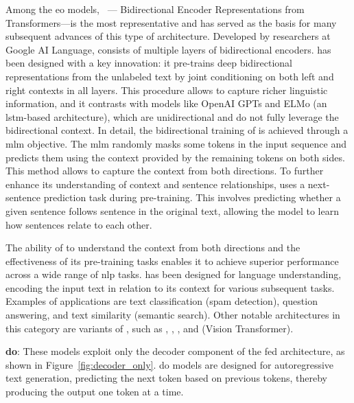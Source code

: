 Among the \gls{eo} models, ~\cite{devlin2018bert}--- Bidirectional Encoder Representations from Transformers---is the most representative and has served as the basis for many subsequent advances of this type of architecture. 
Developed by researchers at Google AI Language,  consists of multiple layers of bidirectional  encoders.
 has been designed with a key innovation: it pre-trains deep bidirectional representations from the unlabeled text by joint conditioning on both left and right contexts in all layers. 
%
This procedure allows  to capture richer linguistic information, and it contrasts with models like OpenAI GPTs and ELMo (an \gls{lstm}-based architecture), which are unidirectional and do not fully leverage the bidirectional context. 
In detail, the bidirectional training of  is achieved through a \gls{mlm} objective. The \gls{mlm} randomly masks some tokens in the input sequence and predicts them using the context provided by the remaining tokens on both sides. This method allows  to capture the context from both directions.
To further enhance its understanding of context and sentence relationships,  uses a next-sentence prediction task during pre-training. This involves predicting whether a given sentence  follows sentence  in the original text, allowing the model to learn how sentences relate to each other.

The ability of  to understand the context from both directions and the effectiveness of its pre-training tasks enables it to achieve superior performance across a wide range of \gls{nlp} tasks.  has been designed for language understanding, 
\ie
encoding the input text in relation to its context for various subsequent tasks. Examples of applications are text classification (\eg spam detection), question answering, and text similarity (\eg semantic search).
Other notable architectures in this category are variants of , such as , , , and  (Vision Transformer).


%
\vspace{5pt}
\noindent
\textbf{\gls{do}}:
These models exploit only the decoder component of the \gls{fed} architecture, as shown in Figure~\ref{fig:decoder_only}. 
\gls{do} models are designed for autoregressive text generation, predicting the next token based on previous tokens, thereby producing the output one token at a time.


